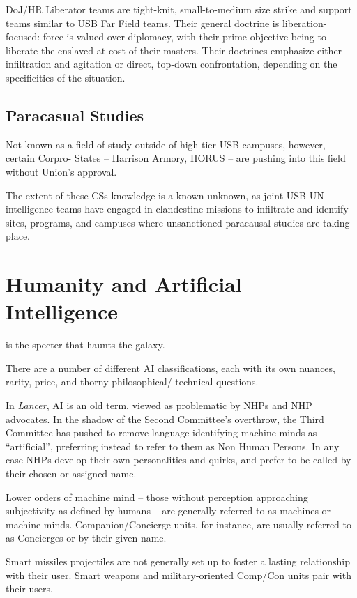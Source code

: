 DoJ/HR Liberator teams are tight-knit, small-to-medium size strike and support teams similar to
USB Far Field teams. Their general doctrine is liberation-focused: force is valued over diplomacy,
with their prime objective being to liberate the enslaved at cost of their masters. Their doctrines
emphasize either infiltration and agitation or direct, top-down confrontation, depending on the
specificities of the situation.

\subsection{Paracasual Studies}

Not known as a field of study outside of high-tier USB campuses, however, certain Corpro-
States -- Harrison Armory, HORUS -- are pushing into this field without Union’s approval.

The extent of these CSs knowledge is a known-unknown, as joint USB-UN intelligence teams
have engaged in clandestine missions to infiltrate and identify sites, programs, and campuses
where unsanctioned paracausal studies are taking place.

\section{Humanity and Artificial Intelligence}

 is the specter that haunts the galaxy.

There are a number of different AI classifications, each with its own nuances, rarity, price, and
thorny philosophical/ technical questions.

In \textit{Lancer}, AI is an old term, viewed as problematic by NHPs and NHP advocates. In the shadow
of the Second Committee’s overthrow, the Third Committee has pushed to remove language
identifying machine minds as ``artificial'', preferring instead to refer to them as Non Human
Persons. In any case NHPs develop their own personalities and quirks, and prefer to be called by
their chosen or assigned name.

Lower orders of machine mind -- those without perception approaching subjectivity as defined
by humans -- are generally referred to as machines or machine minds. Companion/Concierge
units, for instance, are usually referred to as Concierges or by their given name.

Smart missiles projectiles are not generally set up to foster a lasting relationship with their user.
Smart weapons and military-oriented Comp/Con units pair with their users.

